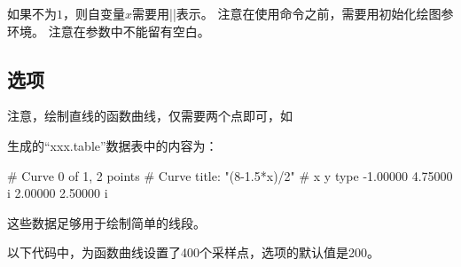 \documentclass[../main.tex]{subfiles}
\begin{document}
\tkzBomb 如果不为$1$，则自变量$x$需要用|\x|表示。
\tkzHand 注意在使用命令之前，需要用初始化绘图参环境。
\tkzBomb 注意在参数中不能留有空白。
\subsection{选项}

注意，绘制直线的函数曲线，仅需要两个点即可，如

\begin{tkzltxexample}[]
\end{tkzltxexample}


生成的\enquote{xxx.table}数据表中的内容为：

\begin{tkzltxexample}[]
# Curve 0 of 1, 2 points
# Curve title: "(8-1.5*x)/2"
# x y type
-1.00000 4.75000  i
2.00000 2.50000  i
\end{tkzltxexample}

这些数据足够用于绘制简单的线段。

以下代码中，为函数曲线设置了400个采样点，选项的默认值是200。

\medskip
\begin{tkzexample}[latex=7cm]
\end{tkzexample}
\end{document}
